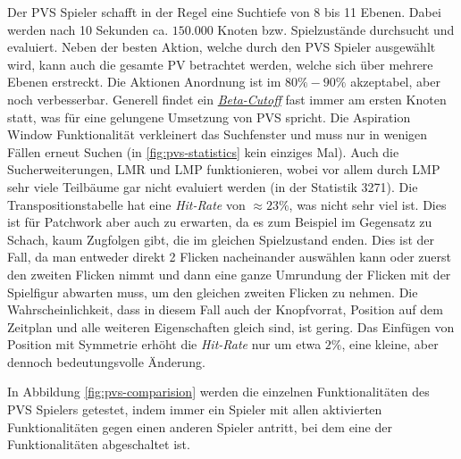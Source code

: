 Der \ac{PVS} Spieler schafft in der Regel eine Suchtiefe von 8 bis 11 Ebenen. Dabei werden nach 10 Sekunden ca. $150{.}000$ Knoten bzw. Spielzustände durchsucht und evaluiert. Neben der besten Aktion, welche durch den \ac{PVS} Spieler ausgewählt wird, kann auch die gesamte \acs{PV} betrachtet werden, welche sich über mehrere Ebenen erstreckt. Die Aktionen Anordnung ist im $80\%-90\%$ akzeptabel, aber noch verbesserbar. Generell findet ein \hyperref[text:beta-cutoff]{\emph{Beta-Cutoff}} fast immer am ersten Knoten statt, was für eine gelungene Umsetzung von \ac{PVS} spricht. Die Aspiration Window Funktionalität verkleinert das Suchfenster und muss nur in wenigen Fällen erneut Suchen (in \ref{fig:pvs-statistics} kein einziges Mal). Auch die Sucherweiterungen, \ac{LMR} und \ac{LMP} funktionieren, wobei vor allem durch \ac{LMP} sehr viele Teilbäume gar nicht evaluiert werden (in der Statistik 3271). Die Transpositionstabelle hat eine \emph{Hit-Rate} von $\approx 23\%$, was nicht sehr viel ist. Dies ist für Patchwork aber auch zu erwarten, da es zum Beispiel im Gegensatz zu Schach, kaum Zugfolgen gibt, die im gleichen Spielzustand enden. Dies ist der Fall, da man entweder direkt 2 Flicken nacheinander auswählen kann oder zuerst den zweiten Flicken nimmt und dann eine ganze Umrundung der Flicken mit der Spielfigur abwarten muss, um den gleichen zweiten Flicken zu nehmen. Die Wahrscheinlichkeit, dass in diesem Fall auch der Knopfvorrat, Position auf dem Zeitplan und alle weiteren Eigenschaften gleich sind, ist gering. Das Einfügen von Position mit Symmetrie erhöht die \emph{Hit-Rate} nur um etwa $2\%$, eine kleine, aber dennoch bedeutungsvolle Änderung.

In Abbildung \ref{fig:pvs-comparision} werden die einzelnen Funktionalitäten des \ac{PVS} Spielers getestet, indem immer ein Spieler mit allen aktivierten Funktionalitäten gegen einen anderen Spieler antritt, bei dem eine der Funktionalitäten abgeschaltet ist.

